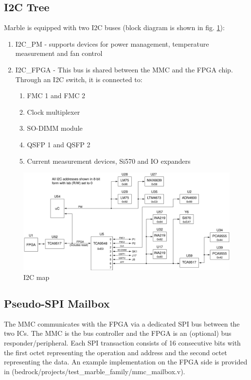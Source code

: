 \documentclass[12pt,oneside,a4]{article}
\begin{document}
\subsection{I2C Tree}
Marble is equipped with two I2C buses (block diagram is shown in fig. \ref{i2c}):
\begin{enumerate}
	\item I2C\_PM - supports devices for power management, temperature measurement and fan control
	\item I2C\_FPGA - This bus is shared between the MMC and the FPGA chip. Through an I2C switch, it is connected to:
	\begin{enumerate}
		\item FMC 1 and FMC 2
		\item Clock multiplexer
		\item SO-DIMM module
		\item QSFP 1 and QSFP 2
		\item Current measurement devices, Si570 and IO expanders
	\end{enumerate}
\end{enumerate}
\begin{figure}[H]
\begin{center}
\includegraphics[width=1\linewidth]{marble2_i2c.png}
 \caption{I2C map}\label{i2c}
\end{center}
\end{figure}

\subsection{Pseudo-SPI Mailbox}\label{sec:MMC:Mailbox}
  The MMC communicates with the FPGA via a dedicated SPI bus between the two ICs.  The MMC is the bus controller and the
FPGA is an (optional) bus responder/peripheral.  Each SPI transaction consists of 16 consecutive bits with the
first octet representing the operation and address and the second octet representing the data.  An example implementation
on the FPGA side is provided in (bedrock/projects/test\_marble\_family/mmc\_mailbox.v).
\end{document}
